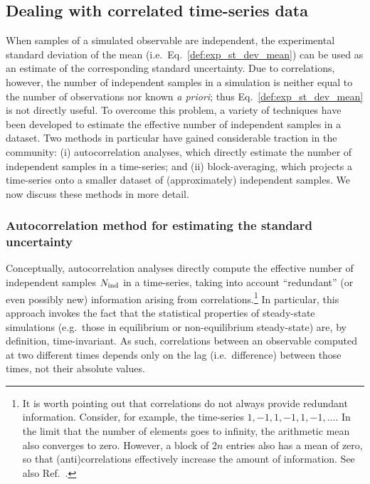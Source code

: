 \subsection{Dealing with correlated time-series data}

When samples of a simulated observable are independent, the experimental standard deviation of the mean (i.e.\  Eq.~\hyperref[def:exp_st_dev]{\ref{def:exp_st_dev_mean}}) can be used as an estimate of the corresponding standard uncertainty.  Due to correlations, however, the number of independent samples in a simulation is neither equal to the number of observations nor known {\it a priori}; thus Eq.~\ref{def:exp_st_dev_mean} is not directly useful.  To overcome this problem, a variety of techniques have been developed to estimate the effective number of independent samples in a dataset.  Two methods in particular have gained considerable traction in the community:  (i) autocorrelation analyses, which directly estimate the number of independent samples in a time-series; and (ii) block-averaging, which projects a time-series onto a smaller dataset of (approximately) independent samples.  We now discuss these methods in more detail.


\subsubsection{Autocorrelation method for estimating the standard uncertainty}\label{sec:autocorrelation}

Conceptually, autocorrelation analyses directly compute the effective number of independent samples $N_{\rm ind}$ in a time-series, taking into account ``redundant'' (or even possibly new) information arising from correlations.\footnote{It is worth pointing out that correlations do not always provide redundant information.  Consider, for example, the time-series $1,-1,1,-1,1,-1,...$.  In the limit that the number of elements goes to infinity, the arithmetic mean also converges to zero.  However, a block of $2n$ entries also has a mean of zero, so that (anti)correlations effectively increase the amount of information.  See also Ref.~\cite{PatroneAIAA}. }  In particular, this approach invokes the fact that the statistical properties of steady-state simulations (e.g.\ those in equilibrium or non-equilibrium steady-state) are, by definition, time-invariant.  As such, correlations between an observable computed at two different times depends only on the lag (i.e.\ difference) between those times, not their absolute values.

